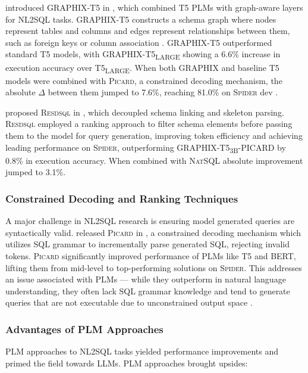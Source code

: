 \citeauthor*{GRAPHIX} introduced GRAPHIX-T5 in \citeyear{GRAPHIX}, which
combined T5 PLMs with graph-aware layers for NL2SQL tasks. GRAPHIX-T5
constructs a schema graph where nodes represent tables and columns and edges
represent relationships between them, such as foreign keys or column
association \citep{GRAPHIX}. GRAPHIX-T5 outperformed standard T5 models, with
GRAPHIX-T5\textsubscript{\tiny{LARGE}} showing a 6.6\% increase in execution
accuracy over T5\textsubscript{\tiny{LARGE}}. When both GRAPHIX and baseline T5
models were combined with \textsc{Picard}, a constrained decoding mechanism,
the absolute $\Delta$ between them jumped to 7.6\%, reaching 81.0\% on
\textsc{Spider} dev \citep{GRAPHIX}.

\citeauthor*{RESDSQL} proposed \textsc{Resdsql} in \citeyear{RESDSQL}, which
decoupled schema linking and skeleton parsing. \textsc{Resdsql}
employed a ranking approach to filter schema elements before passing them to
the model for query generation, improving token efficiency and achieving
leading performance on \textsc{Spider}, outperforming
GRAPHIX-T5\textsubscript{\tiny{3B}}-PICARD by 0.8\% in execution accuracy.
When combined with \textsc{NatSQL} \citep{NATSQL} absolute improvement jumped
to 3.1\%.

\subsubsection{Constrained Decoding and Ranking Techniques}

A major challenge in NL2SQL research is ensuring model generated queries are
syntactically valid. \citeauthor*{PICARD} released \textsc{Picard} in
\citeyear{PICARD}, a constrained decoding mechanism which utilizes SQL grammar
to incrementally parse generated SQL, rejecting invalid tokens. \textsc{Picard}
significantly improved performance of PLMs like T5 and
BERT, lifting them from mid-level to top-performing solutions on
\textsc{Spider}. This addresses an issue associated with PLMs —
while they outperform in natural language understanding, they often lack SQL
grammar knowledge and tend to generate queries that are not executable due to
unconstrained output space \citep{PICARD}.

\subsubsection{Advantages of PLM Approaches}

PLM approaches to NL2SQL tasks yielded performance improvements and primed the
field towards LLMs. PLM approaches brought upsides:


